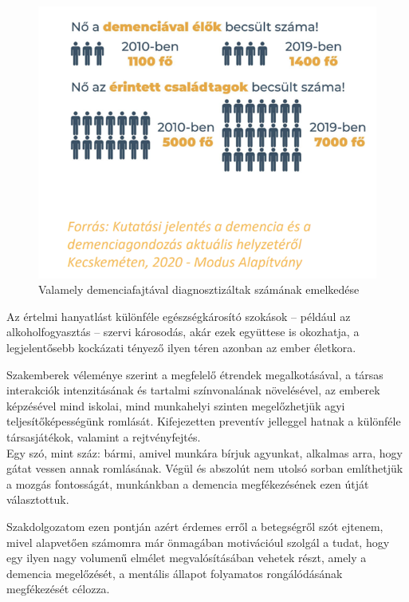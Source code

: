 \documentclass[tocnopagenum]{thesis-ekf}
\theoremstyle{definition}
\theoremstyle{remark}
\begin{document}
	\begin{figure}[h!]
		\centering
		\includegraphics[scale=0.7]{images/demencia.png}
		\caption{Valamely demenciafajtával diagnosztizáltak számának emelkedése}
		\label{fig:demencia}
	\end{figure}

	Az értelmi hanyatlást különféle egészségkárosító szokások -- például az alkoholfogyasztás -- szervi károsodás, akár ezek együttese is okozhatja, a legjelentősebb kockázati tényező ilyen téren azonban az ember életkora. 
	
	Szakemberek véleménye szerint a megfelelő étrendek megalkotásával, a társas interakciók intenzitásának és tartalmi színvonalának növelésével, az emberek képzésével mind iskolai, mind munkahelyi szinten megelőzhetjük agyi teljesítőképességünk romlását. 
	Kifejezetten preventív jelleggel hatnak a különféle társasjátékok, valamint a rejtvényfejtés.\\Egy szó, mint száz: bármi, amivel munkára bírjuk agyunkat, alkalmas arra, hogy gátat vessen annak romlásának.
	Végül és abszolút nem utolsó sorban említhetjük a mozgás fontosságát, munkánkban a demencia megfékezésének ezen útját választottuk.

	Szakdolgozatom ezen pontján azért érdemes erről a betegségről szót ejtenem, mivel alapvetően számomra már önmagában motivációul szolgál a tudat, hogy egy ilyen nagy volumenű elmélet megvalósításában vehetek részt, amely a demencia megelőzését, a mentális állapot folyamatos rongálódásának megfékezését célozza. 
	\cite{dementia1}
	\cite{dementia2}
	\cite{dementia3}
\end{document}
